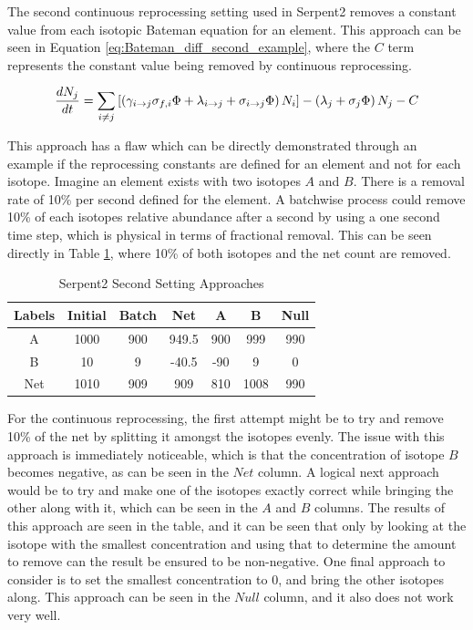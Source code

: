 The second continuous reprocessing setting used in Serpent2 removes a constant value from each isotopic Bateman equation for an element. This approach can be seen in Equation \ref{eq:Bateman_diff_second_example}, where the $C$ term represents the constant value being removed by continuous reprocessing.

\begin{equation} \hfill
\frac{dN_j}{dt} = \sum_{i \neq j} \left [ \left( \gamma_{i \rightarrow j} \sigma_{f, i} \Phi + \lambda _{i \rightarrow j} + \sigma_{i \rightarrow j} \Phi \right) N_i \right ] - \left ( \lambda_j + \sigma_j \Phi \right ) N_j - C
\hfill\label{eq:Bateman_diff_second_example} \end{equation}

This approach has a flaw which can be directly demonstrated through an example if the reprocessing constants are defined for an element and not for each isotope. Imagine an element exists with two isotopes $A$ and $B$. There is a removal rate of 10\% per second defined for the element. A batchwise process could remove 10\% of each isotopes relative abundance after a second by using a one second time step, which is physical in terms of fractional removal. This can be seen directly in Table \ref{tab:cont_repr_appr}, where 10\% of both isotopes and the net count are removed.

\begin{table}[ht]
\renewcommand{\arraystretch}{1.25}
\caption{Serpent2 Second Setting Approaches}
\label{tab:cont_repr_appr}
\begin{center}
\begin{tabular}{ | c | c | c | c | c | c | c |}
 \hline
 Labels & Initial & Batch & Net & A & B & Null\\
 \hline
 \hline
 A & 1000 & 900 & 949.5 & 900 & 999 & 990\\
 B & 10 & 9 & -40.5 & -90 & 9 & 0\\
 \hline
 Net & 1010 & 909 & 909 & 810 & 1008 & 990 \\
 \hline
\end{tabular}
\end{center}
\end{table}

For the continuous reprocessing, the first attempt might be to try and remove 10\% of the net by splitting it amongst the isotopes evenly. The issue with this approach is immediately noticeable, which is that the concentration of isotope $B$ becomes negative, as can be seen in the $Net$ column. A logical next approach would be to try and make one of the isotopes exactly correct while bringing the other along with it, which can be seen in the $A$ and $B$ columns. The results of this approach are seen in the table, and it can be seen that only by looking at the isotope with the smallest concentration and using that to determine the amount to remove can the result be ensured to be non-negative. One final approach to consider is to set the smallest concentration to 0, and bring the other isotopes along. This approach can be seen in the $Null$ column, and it also does not work very well.

